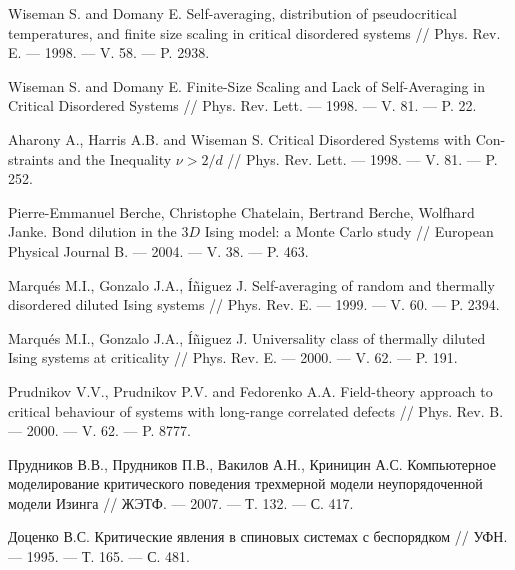 \begin{thebibliography}{11}
Wiseman S. and Domany E. Self-averaging, distribution of pseudocritical temperatures, and finite size scaling in critical disordered systems // Phys. Rev. E. --- 1998. ---  V. 58. --- P. 2938.



Wiseman S. and Domany E. Finite-Size Scaling and Lack of Self-Averaging in Critical Disordered Systems // Phys. Rev. Lett. --- 1998. --- V. 81. --- P. 22.



Aharony A., Harris A.B. and Wiseman S. Critical Disordered Systems with Con-straints and the Inequality $\nu > 2/d$  // Phys. Rev. Lett. --- 1998. --- V. 81. --- P. 252.



Pierre-Emmanuel Berche, Christophe Chatelain, Bertrand Berche, Wolfhard Janke. Bond dilution in the $3D$ Ising model: a Monte Carlo study // European Physical Journal B. --- 2004. --- V. 38. --- P. 463.



Marqués M.I., Gonzalo J.A., Íñiguez J. Self-averaging of random and thermally disordered diluted Ising systems // Phys. Rev. E. --- 1999. --- V. 60. --- P. 2394.



Marqués M.I., Gonzalo J.A., Íñiguez J. Universality class of thermally diluted Ising systems at criticality // Phys. Rev. E. --- 2000. --- V. 62. --- P. 191.



Prudnikov V.V., Prudnikov P.V. and Fedorenko A.A. Field-theory approach to critical behaviour of systems with long-range correlated defects // Phys. Rev. B. --- 2000. --- V. 62. --- P. 8777.



Прудников В.В., Прудников П.В., Вакилов А.Н., Криницин А.С. Компьютерное моделирование критического поведения трехмерной модели неупорядоченной модели Изинга // ЖЭТФ. --- 2007. --- Т. 132. --- С. 417.



Доценко В.С. Критические явления в спиновых системах с беспорядком // УФН. --- 1995. --- Т. 165. --- С. 481.











\end{thebibliography}
